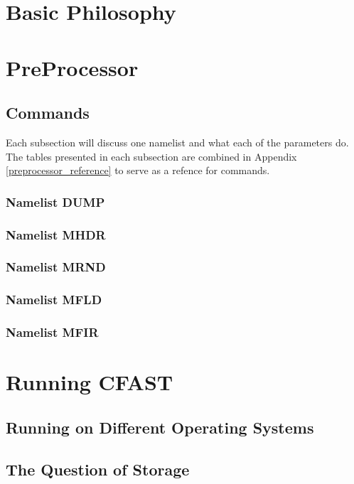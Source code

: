 \documentclass[12pt,twoside]{book}
\begin{document}
\section{Basic Philosophy}

\section{PreProcessor}

\subsection{Commands}
\label{commands_section}
Each subsection will discuss one namelist and what each of the parameters do. The tables presented in each subsection are combined in Appendix \ref{preprocessor_reference}  to serve as a refence for commands.

\subsubsection{Namelist DUMP}

\subsubsection{Namelist MHDR}

\subsubsection{Namelist MRND}

\subsubsection{Namelist MFLD}

\subsubsection{Namelist MFIR}

\section{Running CFAST}

\subsection{Running on Different Operating Systems}

\subsection{The Question of Storage}
\end{document}
